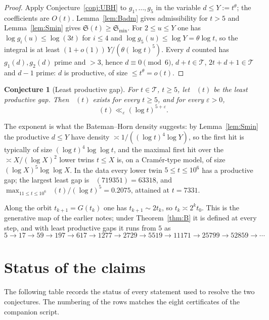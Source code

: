 \documentclass[11pt,a4paper]{article}
\newtheorem{conjecture}[theorem]{Conjecture}
\theoremstyle{definition}
\theoremstyle{remark}
\newcommand{\T}{\mathcal{T}}
\newcommand{\Sing}{\mathfrak{S}}
\DeclareMathOperator{\dmin}{d_{\min}}
\begin{document}
\begin{proof}
Apply Conjecture~\ref{conj:UBH} to $g_1,\dots,g_5$ in the variable $d\le Y := t^{\theta}$; the coefficients are $O(t)$.
Lemma~\ref{lem:Badm} gives admissibility for $t>5$ and Lemma~\ref{lem:Smin} gives $\Sing(t)\ge\Sing_{\min}$.
For $2\le u\le Y$ one has $\log g_i(u)\le\log(3t)$ for $i\le 4$ and $\log g_5(u)\le\log Y = \theta\log t$, so the integral is at least $(1+o(1))\,Y/(\theta(\log t)^5)$.
Every $d$ counted has $g_1(d),g_2(d)$ prime and $>3$, hence $d\equiv 0\pmod 6$, $d+t\in\T$, $2t+d+1\in\T$ and $d-1$ prime: $d$ is productive, of size $\le t^{\theta} = o(t)$.
\end{proof}

\begin{conjecture}[Least productive gap]\label{conj:dmin}
For $t\in\T$, $t\ge 5$, let $\dmin(t)$ be the least productive gap.
Then $\dmin(t)$ exists for every $t\ge 5$, and for every $\varepsilon>0$,
\[
\dmin(t)\ll_\varepsilon(\log t)^{5+\varepsilon}.
\]
\end{conjecture}

The exponent is what the Bateman--Horn density suggests: by Lemma~\ref{lem:Smin} the productive $d\le Y$ have density $\asymp 1/((\log t)^4\log Y)$, so the first hit is typically of size $(\log t)^4\log\log t$, and the maximal first hit over the $\asymp X/(\log X)^2$ lower twins $t\le X$ is, on a Cram\'er-type model, of size $(\log X)^5\log\log X$.
In the data every lower twin $5\le t\le 10^6$ has a productive gap; the largest least gap is $\dmin(719351) = 63318$, and $\max_{11\le t\le 10^6}\dmin(t)/(\log t)^5 = 0.2075$, attained at $t = 7331$.

Along the orbit $t_{k+1} = G(t_k)$ one has $t_{k+1}\sim 2t_k$, so $t_k\asymp 2^kt_0$.
This is the generative map of the earlier notes; under Theorem~\ref{thm:B} it is defined at every step, and with least productive gaps it runs from $5$ as
\[
5\to 17\to 59\to 197\to 617\to 1277\to 2729\to 5519\to 11171\to 25799\to 52859\to\cdots
\]

\section{Status of the claims}\label{sec:status}

The following table records the status of every statement used to resolve the two conjectures.
The numbering of the rows matches the eight certificates of the companion script.
\end{document}
